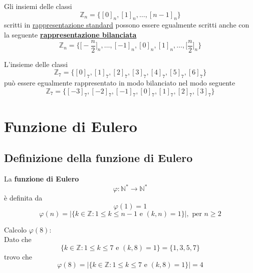 \documentclass[a4paper,12pt, oneside]{book}
\begin{document}
\begin{nota}
	Gli insiemi delle classi
	$$\mathbb{Z}_n = \{ [0]_n, [1]_n, \dots, [n-1]_n \}$$
	scritti in \underline{rappresentazione standard} possono essere egualmente scritti anche con la seguente \underline{\textbf{rappresentazione bilanciata}}
	$$\mathbb{Z}_n = \{ \Big[-\frac{n}{2}\Big]_n, \dots, [-1]_n, [0]_n, [1]_n, \dots, \Big[\frac{n}{2}\Big]_n \}$$
	\begin{shaded}
		\begin{esempio}
			L'insieme delle classi
			$$\mathbb{Z}_7 = \{ [0]_7, [1]_7, [2]_7, [3]_7, [4]_7, [5]_7, [6]_7 \}$$
			può essere egualmente rappresentato in modo bilanciato nel modo seguente
			$$\mathbb{Z}_7 = \{ [-3]_7, [-2]_7, [-1]_7, [0]_7, [1]_7, [2]_7, [3]_7 \}$$
		\end{esempio}
	\end{shaded}
\end{nota}

\chapter{Funzione di Eulero}
\section{Definizione della funzione di Eulero}
\begin{definizione}
	La \textbf{funzione di Eulero} $$\varphi: \mathbb{N}^* \rightarrow \mathbb{N}^*$$ è definita da\\
	$$\varphi(1)=1$$
	$$\varphi(n)=|\{ k \in \mathbb{Z} : 1 \leq k \leq n-1 \mbox{ e } (k,n)=1  \}|,\mbox{ per } n \geq 2$$
\end{definizione}
\begin{esempio}
	Calcolo $\varphi(8)$:\\
	Dato che $$\{ k \in \mathbb{Z} : 1 \leq k \leq 7 \mbox{ e } (k,8)=1 \} = \{ 1,3,5,7 \}$$
	trovo che
	$$\varphi(8)=|\{ k \in \mathbb{Z} : 1 \leq k \leq 7 \mbox{ e } (k,8)=1  \}| = 4$$
\end{esempio}
\end{document}
